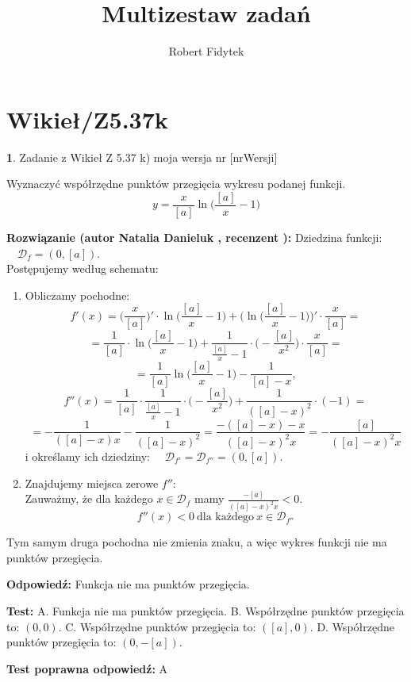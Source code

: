 \documentclass[12pt, a4paper]{article}
\title{Multizestaw zadań}
\author{Robert Fidytek}
\date{}
\theoremstyle{definition} %
\newtheorem{zad}{}
\newcommand{\kategoria}[1]{\section{#1}} %
\newcommand{\zadStart}[1]{\begin{zad}#1\newline} %
\newcommand{\zadStop}{\end{zad}}   %
\newcommand{\rozwStart}[2]{\noindent \textbf{Rozwiązanie (autor #1 , recenzent #2): }\newline} %
\newcommand{\rozwStop}{\newline}                                            %
\newcommand{\odpStart}{\noindent \textbf{Odpowiedź:}\newline}    %
\newcommand{\odpStop}{\newline}                                             %
\newcommand{\testStart}{\noindent \textbf{Test:}\newline} %
\newcommand{\testStop}{\newline} %
\newcommand{\kluczStart}{\noindent \textbf{Test poprawna odpowiedź:}\newline} %
\newcommand{\kluczStop}{\newline} %
\begin{document}
\maketitle

\kategoria{Wikieł/Z5.37k}

\zadStart{Zadanie z Wikieł Z 5.37 k) moja wersja nr [nrWersji]}

Wyznaczyć współrzędne punktów przegięcia wykresu podanej funkcji.
$$y =  \frac{x}{[a]} \ln \Big(\frac{[a]}{x} - 1\Big)$$
\zadStop

\rozwStart{Natalia Danieluk}{}
Dziedzina funkcji: $\quad \mathcal{D}_f=(0,[a])$. \\
Postępujemy według schematu:
\begin{enumerate}
\item Obliczamy pochodne: 
$$f'(x) = \Big(\frac{x}{[a]}\Big)' \cdot \ln \Big(\frac{[a]}{x} - 1\Big) + \Bigg(\ln \Big(\frac{[a]}{x} - 1\Big)\Bigg)'\cdot\frac{x}{[a]} = $$
$$= \frac{1}{[a]} \cdot \ln \Big(\frac{[a]}{x} - 1\Big) + \frac{1}{\frac{[a]}{x} - 1} \cdot \Big(-\frac{[a]}{x^2}\Big)\cdot\frac{x}{[a]} = $$
$$= \frac{1}{[a]} \ln \Big(\frac{[a]}{x} - 1\Big) - \frac{1}{[a]-x},$$ 
$$f''(x) = \frac{1}{[a]} \cdot \frac{1}{\frac{[a]}{x} - 1} \cdot \Big(-\frac{[a]}{x^2}\Big) + \frac{1}{([a]-x)^2} \cdot (-1) = $$
$$= -\frac{1}{([a]-x)x} - \frac{1}{([a]-x)^2} = \frac{-([a]-x)-x}{([a]-x)^2x} = -\frac{[a]}{([a]-x)^2x}$$
i określamy ich dziedziny: $\quad \mathcal{D}_{f'}=\mathcal{D}_{f''}=(0,[a])$. \\
\item Znajdujemy miejsca zerowe $f''$: \\
Zauważmy, że dla każdego $x \in \mathcal{D}_f$ mamy $\frac{-[a]}{([a]-x)^2x} < 0$. \\
$$f''(x) < 0 \ \text{dla każdego} \ x \in \mathcal{D}_{f''}$$
\end{enumerate}
Tym samym druga pochodna nie zmienia znaku, a więc wykres funkcji nie ma punktów przegięcia.
\rozwStop

\odpStart
Funkcja nie ma punktów przegięcia.
\odpStop

\testStart
A. Funkcja nie ma punktów przegięcia.
B. Współrzędne punktów przegięcia to: $(0,0)$.
C. Współrzędne punktów przegięcia to:  $([a],0)$.
D. Współrzędne punktów przegięcia to:  $(0,-[a])$.
\testStop

\kluczStart
A
\kluczStop
\end{document}
